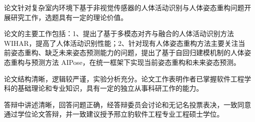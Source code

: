 
论文针对复杂室内环境下基于非视觉传感器的人体活动识别与人体姿态重构问题开展研究工作，选题具有一定的理论价值。

论文的主要工作包括：1、提出了基于多模态对齐与融合的人体活动识别方法 WIHAR，提高了人体活动识别性能；2、针对现有人体姿态重构方法主要关注当前姿态重构、缺乏未来姿态预测能力的问题，提出了基于自回归建模机制的人体姿态重构与预测方法 AIPose，在统一框架下实现当前姿态重构和未来姿态预测。

论文结构清晰，逻辑较严谨，实验分析充分。论文工作表明作者已掌握软件工程学科的基础理论和专业知识，具有一定的独立从事科研工作的能力。

答辩中讲述清晰，回答问题正确，经答辩委员会讨论和无记名投票表决，一致同意通过学位论文答辩，并一致建议授予邢立豹软件工程专业工程硕士学位。